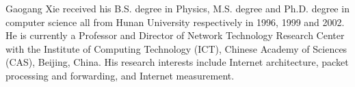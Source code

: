 



\begin{IEEEbiography}{Gaogang Xie}
received his B.S. degree in Physics, M.S. degree and Ph.D. degree in computer science all from Hunan University respectively in 1996, 1999 and 2002. He is currently a Professor and Director of Network Technology Research Center with the Institute of Computing Technology (ICT), Chinese Academy of Sciences (CAS), Beijing, China. His research interests include Internet architecture, packet processing and forwarding, and Internet measurement.
\end{IEEEbiography}

